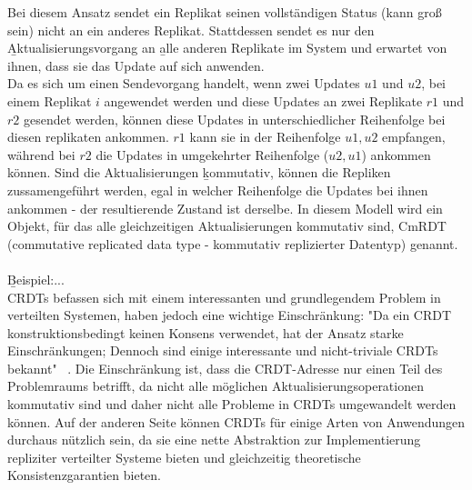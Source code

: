 Bei diesem Ansatz sendet ein Replikat seinen vollständigen Status (kann groß sein) nicht an ein anderes Replikat.
Stattdessen sendet es nur den \b{Aktualisierungsvorgang} an \b{alle} anderen Replikate im System und erwartet von ihnen, dass sie das Update auf sich anwenden.\\
Da es sich um einen Sendevorgang handelt, wenn zwei Updates $u1$ und $u2$, bei einem Replikat $i$ angewendet werden und diese Updates an zwei Replikate $r1$ und $r2$ gesendet werden, können diese Updates in unterschiedlicher Reihenfolge bei diesen replikaten ankommen.
$r1$ kann sie in der Reihenfolge $u1, u2$ empfangen, während bei $r2$ die Updates in umgekehrter Reihenfolge ($u2, u1$) ankommen können.
Sind die Aktualisierungen \b{kommutativ}, können die Repliken zussamengeführt werden, egal in welcher Reihenfolge die Updates bei ihnen ankommen - der resultierende Zustand ist derselbe. In diesem Modell wird ein Objekt, für das alle gleichzeitigen Aktualisierungen kommutativ sind, CmRDT (commutative replicated data type - kommutativ replizierter Datentyp) genannt. \\\\
\b{Beispiel:...}\\
CRDTs befassen sich mit einem interessanten und grundlegendem Problem in verteilten Systemen, haben jedoch eine wichtige Einschränkung: "Da ein CRDT konstruktionsbedingt keinen Konsens verwendet, hat der Ansatz starke Einschränkungen; Dennoch sind einige interessante und nicht-triviale CRDTs bekannt" ~\cite{crdt_shapiro2}.
Die Einschränkung ist, dass die CRDT-Adresse nur einen Teil des Problemraums betrifft, da nicht alle möglichen Aktualisierungsoperationen kommutativ sind und daher nicht alle Probleme in CRDTs umgewandelt werden können. Auf der anderen Seite können CRDTs für einige Arten von Anwendungen durchaus nützlich sein, da sie eine nette Abstraktion zur Implementierung repliziter verteilter Systeme bieten und gleichzeitig theoretische Konsistenzgarantien bieten.
%
